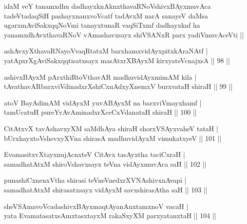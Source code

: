 \newpage

\centerline{}

\begin{shl}
idaM veY tanamxdhu dadhayxknAknxthavaRNoV\s shivxBAyxmuvAca tadeVtadaqSiH pashayxnanxvoVcatf tadAvxM narA sanayeV daMsa ugarxmAviSakxqqNoVmi tanayxtunaR vaqSiTxmf dadhayxknf ha yanamxdhAvxthavaRNoV vAmashavxsayx shiVSANxR parx yadiVmuvAceVti ||
\end{shl}


\begin{shl}
ashAvxyXthavaRNayoVvaqRtatxM barxhamxvidAyxpitxkAraNAtf |\\
yatApxrXgAviSakxqqtisatxsayx masAtxrXBAyxM kirxyateV\s cnajxsA \hfill || 98 ||
\end{shl}
\begin{shl}
ashivxBAyxM pArxthiRtoV\s thavAR madhuvidAyxmimAM kila |\\
tAvathavAR\s barxviVdinadxrXshiCxnAdxyXnemxV burxvataH shiraH \hfill || 99 ||
\end{shl}
\begin{shl}
atoV BayAdimAM vidAyxM yuvABAyxM na barxviVmayxhamf |\\
tamUcatuH pureYvA\s \s vAminadxrXceCxVdanataH shiraH \hfill || 100 ||
\end{shl}
\begin{shl}
CitAtxvX tavAshavxyXM saMdhAya shiraH shorxVSAyxvaheV tataH |\\
bUrxhayxtoV\s shevxyXVna shirasA madhuvidAyxM vimukatxyeV \hfill || 101 ||
\end{shl}
\begin{shl}
EvamasitxvXtayxnujAcnxteV CitAvx tasAyxtha taciCxraH |\\
samadhatAtxM shiroV\s shavxsayx teVna vidAyxmuvAca saH \hfill || 102 ||
\end{shl}
\begin{shl}
punashiCxnenxV\s tha shirasi teVneVnedxrXVNAshivxnAvapi |\\
samadhatAtxM shirasatxsayx vidAyxM savxshirasA\s tha saH \hfill || 103 ||
\end{shl}
\begin{shl}
sheVSAmavoVcadashivxBAyxmaqtAyanAnxtamxnoV vacaH |\\
yata EvamatasatxsAmxtasxtayxM rakaSxyXM parxyatanxtaH \hfill || 104 ||
\end{shl}
